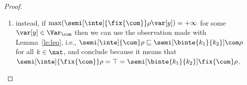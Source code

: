 \begin{proof}
\begin{enumerate}[label=(\roman*)]
  \item instead, if
    \({\max(\semi[\inte]{\fix{\com}}\rho\var[y])} = +\infty\) for some
    \(\var[y]\in \Var_{\com}\) then we can use the observation made
    with Lemma~\ref{le:leq}, i.e., 
    \({\semi[\inte]{\com}\rho} \sqsubseteq
    {\semi[\binte{k_1}{k_2}]{\com}\rho}\) for all \({k \in \nat}\), and
    conclude because it means that
    \({\semi[\inte]{\fix{\com}}\rho} = \top =
    {\semi[\binte{k_1}{k_2}]{\fix{\com}}\rho}\).
  \end{enumerate}
\end{proof}
